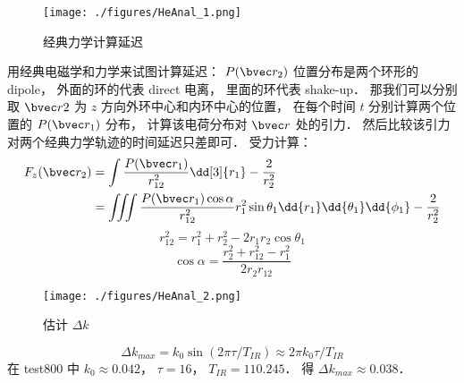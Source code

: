 \begin{figure}[ht]
\centering
\texttt{[image: ./figures/HeAnal\_1.png]}
\caption{经典力学计算延迟} \label{HeAnal_fig1}
\end{figure}

用经典电磁学和力学来试图计算延迟： $P(\bvec r_2)$ 位置分布是两个环形的 dipole， 外面的环的代表 direct 电离， 里面的环代表 shake-up． 那我们可以分别取 $\bvec r2$ 为 $z$ 方向外环中心和内环中心的位置， 在每个时间 $t$ 分别计算两个位置的 $P(\bvec r_1)$ 分布， 计算该电荷分布对 $\bvec r$ 处的引力． 然后比较该引力对两个经典力学轨迹的时间延迟只差即可． 受力计算：
\begin{equation}
\begin{aligned}
F_z(\bvec r_2) &= 
\int \frac{P(\bvec r_1)}{r_{12}^2} \dd[3]{r_1} - \frac{2}{r_2^2}\\
&= \iiint \frac{P(\bvec r_1) \cos\alpha}{r_{12}^2} r_1^2\sin\theta_1 \dd{r_1}\dd{\theta_1}\dd{\phi_1} - \frac{2}{r_2^2}
\end{aligned}
\end{equation}
\begin{equation}
r_{12}^2 = r_1^2 + r_2^2 - 2r_1r_2 \cos\theta_1
\end{equation}
\begin{equation}
\cos\alpha = \frac{r_2^2 + r_{12}^2 - r_1^2}{2r_2 r_{12}}
\end{equation}

\begin{figure}[ht]
\centering
\texttt{[image: ./figures/HeAnal\_2.png]}
\caption{估计 $\Delta k$} \label{HeAnal_fig2}
\end{figure}
\begin{equation}
\Delta k_{max} = k_0 \sin(2\pi \tau/T_{IR}) \approx 2 \pi k_0  \tau/T_{IR}
\end{equation}
在 test800 中 $k_0 \approx 0.042$， $\tau = 16$， $T_{IR} = 110.245$． 得 $\Delta k_{max} \approx 0.038$．
